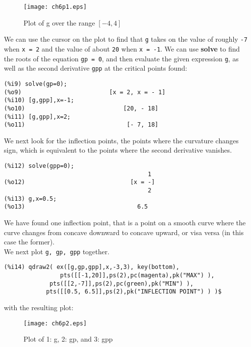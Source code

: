 \documentclass[12pt]{article}
\begin{document}
\smallskip
\begin{figure} [h]
   \centerline{\texttt{[image: ch6p1.eps]} }
	\caption{ Plot of g over the range $[-4,4]$}
\end{figure}               
%
 \smallskip
We can use the cursor on the plot to find that \verb|g| takes on the value of roughly
\verb|-7| when \verb|x = 2| and the value of about \verb|20| when \verb|x = -1|.
We can use \textbf{solve} to find the roots of the equation \verb|gp = 0|, and
  then evaluate the given expression \verb|g|, as well as the second derivative \verb|gpp|
  at the critical points found:
\small
\begin{verbatim}
(%i9) solve(gp=0);
(%o9)                         [x = 2, x = - 1]
(%i10) [g,gpp],x=-1;
(%o10)                            [20, - 18]
(%i11) [g,gpp],x=2;
(%o11)                             [- 7, 18]
\end{verbatim}
\normalsize
We next look for the inflection points, the points where the curvature changes sign, which
  is equivalent to the points where the second derivative vanishes.
\small
\begin{verbatim}
(%i12) solve(gpp=0);
                                         1
(%o12)                              [x = -]
                                         2
(%i13) g,x=0.5;
(%o13)                                6.5										 
\end{verbatim}
\normalsize
We have found one inflection point, that is a point on a smooth curve where the
  curve changes from concave downward to concave upward, or visa versa (in this case
  the former).\\
We next plot \verb|g, gp, gpp| together.
\small
\begin{verbatim}
(%i14) qdraw2( ex([g,gp,gpp],x,-3,3), key(bottom),
                pts([[-1,20]],ps(2),pc(magenta),pk("MAX") ),
             pts([[2,-7]],ps(2),pc(green),pk("MIN") ),
            pts([[0.5, 6.5]],ps(2),pk("INFLECTION POINT") ) )$
\end{verbatim}
\normalsize
%
with the resulting plot:
\smallskip
\begin{figure} [h]
   \centerline{\texttt{[image: ch6p2.eps]} }
	\caption{ Plot of 1: g, 2: gp, and 3: gpp }
\end{figure}               
\end{document}
